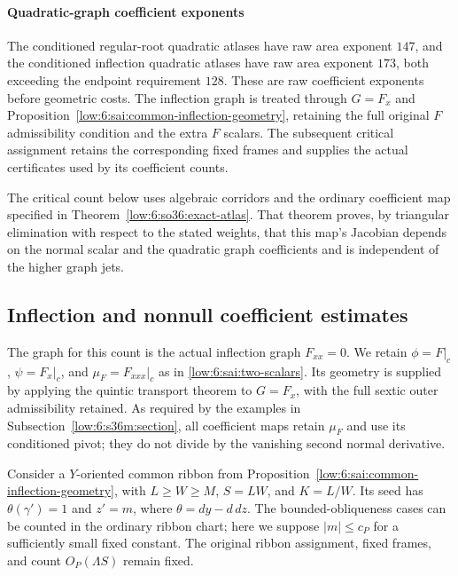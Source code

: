 \documentclass[11pt]{amsart}
\theoremstyle{definition}
\theoremstyle{remark}
\numberwithin{equation}{section}
\begin{document}
\paragraph{Quadratic-graph coefficient exponents}
The conditioned regular-root quadratic atlases have raw area exponent $147$, and the conditioned inflection quadratic atlases have raw area exponent $173$, both exceeding the endpoint requirement $128$. These are raw coefficient exponents before geometric costs. The inflection graph is treated through $G=F_x$ and Proposition~\ref{low:6:sai:common-inflection-geometry}, retaining the full original $F$ admissibility condition and the extra $F$ scalars. The subsequent critical assignment retains the corresponding fixed frames and supplies the actual certificates used by its coefficient counts.

The critical count below uses algebraic corridors and the ordinary coefficient map specified in Theorem~\ref{low:6:so36:exact-atlas}. That theorem proves, by triangular elimination with respect to the stated weights, that this map's Jacobian depends on the normal scalar and the quadratic graph coefficients and is independent of the higher graph jets.

\subsection{Inflection and nonnull coefficient estimates}\label{low:6:inflection-counts}\label{low:6:s36i:small-aspect-section}\label{low:6:s36i:nonnull-section}\label{low:6:inflection-exhaustion}\label{low:6:s36i:exhaustion-section}
The graph for this count is the actual inflection graph $F_{xx}=0$. We retain $\phi=F|_c$, $\psi=F_x|_c$, and $\mu_F=F_{xxx}|_c$ as in \eqref{low:6:sai:two-scalars}. Its geometry is supplied by applying the quintic transport theorem to $G=F_x$, with the full sextic outer admissibility retained. As required by the examples in Subsection~\ref{low:6:s36m:section}, all coefficient maps retain $\mu_F$ and use its conditioned pivot; they do not divide by the vanishing second normal derivative.

Consider a $Y$-oriented common ribbon from Proposition~\ref{low:6:sai:common-inflection-geometry}, with $L\ge W\ge M$, $S=LW$, and $K=L/W$. Its seed has $\theta(\gamma')=1$ and $z'=m$, where $\theta=dy-d\,dz$. The bounded-obliqueness cases can be counted in the ordinary ribbon chart; here we suppose $|m|\le c_P$ for a sufficiently small fixed constant. The original ribbon assignment, fixed frames, and count $O_P(\Lambda S)$ remain fixed.
\end{document}
